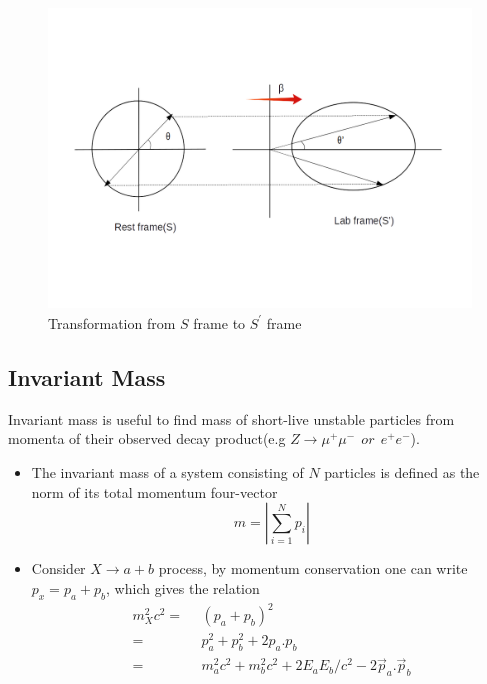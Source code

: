 \begin{figure}[h]
    \centering
    \includegraphics[width=12cm, height=8cm]{3.png}
    \caption{Transformation from $S$ frame to $S^{\prime}$ frame}
    \label{fig:my_label}
\end{figure}
\subsection{Invariant Mass}
Invariant mass is useful to find mass of short-live unstable particles from momenta of their observed decay product(e.g $Z\longrightarrow \mu^{+}\mu^{-} \ \ or \ \ e^{+}e^{-} $).

\begin{itemize}
\item 
The invariant mass of a system consisting of $N$ particles is defined as the norm of its total momentum four-vector 
\begin{equation}
    m = \left|\sum_{i=1}^N p_{i}\right|
\end{equation}
\item
Consider $X\longrightarrow a+b$ process, by momentum conservation one can write 
$p_{x} = p_{a}+ p_{b}$, which gives the relation 
\begin{equation}
\begin{split}
        m^2_X c^{2} =& \ \ (p_{a}+p_{b})^2\\
        =&\ \  p_{a}^2 + p_{b}^2 + 2p_{a}.p_{b}\\
        =&\ \  m_{a}^2c^2 + m_{b}^2c^2 + 2E_{a}E_{b}/c^2 -2\Vec{p}_{a}.\Vec{p}_{b}
\end{split}
\end{equation}
\end{itemize}
